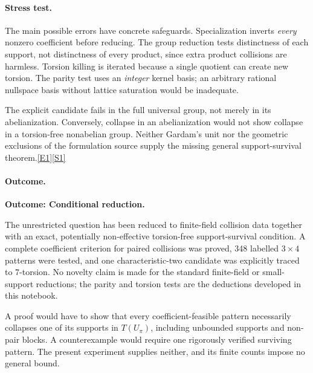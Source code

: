 \documentclass[11pt,a4paper]{article}
\newcommand{\sref}[2]{\hyperlink{source:#1:#2}{[S#2]}}
\newcommand{\eref}[2]{\hyperlink{extra:#1:#2}{[E#2]}}
\begin{document}
\paragraph{Stress test.}
The main possible errors have concrete safeguards. Specialization
inverts \emph{every} nonzero coefficient before reducing. The group
reduction tests distinctness of each support, not distinctness of every
product, since extra product collisions are harmless. Torsion killing
is iterated because a single quotient can create new torsion. The parity
test uses an \emph{integer} kernel basis; an arbitrary rational nullspace
basis without lattice saturation would be inadequate.

The explicit candidate fails in the full universal group, not merely in
its abelianization. Conversely, collapse in an abelianization would not
show collapse in a torsion-free nonabelian group. Neither Gardam's unit
nor the geometric exclusions of the formulation source supply the
missing general support-survival theorem.\eref{204}{1}\sref{204}{1}

\paragraph{Outcome.}
\textbf{Outcome: Conditional reduction.}

The unrestricted question has been reduced to finite-field collision
data together with an exact, potentially non-effective torsion-free
support-survival condition. A complete coefficient criterion for paired
collisions was proved, 348 labelled $3\times4$ patterns were tested, and
one characteristic-two candidate was explicitly traced to $7$-torsion.
No novelty claim is made for the standard finite-field or small-support
reductions; the parity and torsion tests are the deductions developed
in this notebook.

A proof would have to show that every coefficient-feasible pattern
necessarily collapses one of its supports in $T(U_\pi)$, including
unbounded supports and non-pair blocks. A counterexample would require
one rigorously verified surviving pattern. The present experiment
supplies neither, and its finite counts impose no general bound.

\end{document}
